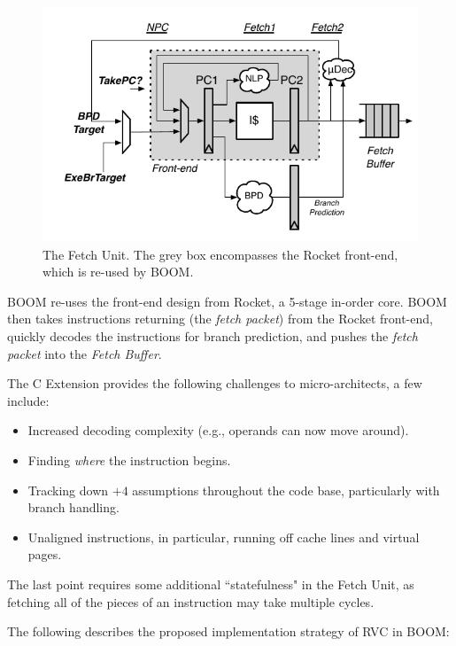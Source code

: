 \begin{figure}[ht]
	\centering
	\centerline{\includegraphics[scale =1] {figures/frontend}}
	\caption{ \small The Fetch Unit. The grey box encompasses the Rocket front-end, which is re-used by BOOM.}
	\label{fig:futurework-frontend}
\end{figure}

BOOM re-uses the front-end design from Rocket, a 5-stage in-order core.  BOOM then takes instructions returning (the {\em fetch packet}) from the Rocket front-end, quickly decodes the instructions for branch prediction, and pushes the {\em fetch packet} into the {\em Fetch Buffer}. 


The C Extension provides the following challenges to micro-architects, a few include:

\begin{itemize}
\item Increased decoding complexity (e.g., operands can now move around). 
\item Finding {\em where} the instruction begins. 
\item Tracking down $+4$ assumptions throughout the code base, particularly with branch handling.
\item Unaligned instructions, in particular, running off cache lines and virtual pages. 
\end{itemize}

The last point requires some additional ``statefulness" in the Fetch Unit, as fetching all of the pieces of an instruction may take multiple cycles. 

The following describes the proposed implementation strategy of RVC in BOOM:

